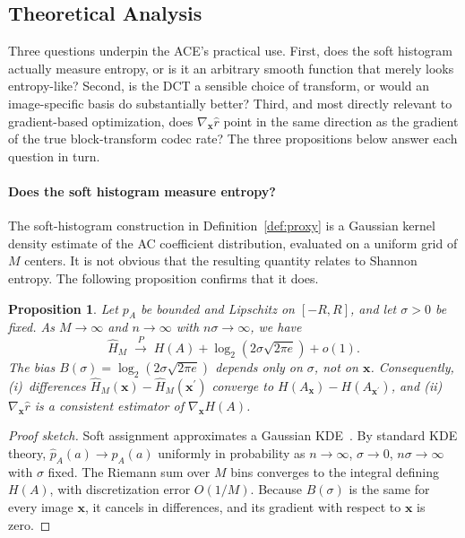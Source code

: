 \documentclass{article}
\newtheorem{proposition}{Proposition}
\theoremstyle{definition}
\newcommand{\bx}{\boldsymbol{x}}
\begin{document}
\subsection{Theoretical Analysis}
\label{sec:theory}

Three questions underpin the ACE's practical use.
First, does the soft histogram actually measure entropy, or is it an arbitrary smooth function that merely looks entropy-like?
Second, is the DCT a sensible choice of transform, or would an image-specific basis do substantially better?
Third, and most directly relevant to gradient-based optimization, does $\nabla_{\bx}\hat{r}$ point in the same direction as the gradient of the true block-transform codec rate?
The three propositions below answer each question in turn.

\paragraph{Does the soft histogram measure entropy?}
The soft-histogram construction in Definition~\ref{def:proxy} is a Gaussian kernel density estimate of the AC coefficient distribution, evaluated on a uniform grid of $M$ centers.
It is not obvious that the resulting quantity relates to Shannon entropy.
The following proposition confirms that it does.

\begin{proposition}
\label{prop:convergence}
Let $p_A$ be bounded and Lipschitz on $[-R,R]$, and let $\sigma>0$ be fixed.
As $M\to\infty$ and $n\to\infty$ with $n\sigma\to\infty$, we have
\[
  \hat{H}_M \;\xrightarrow{P}\; H(A) + \log_2(2\sigma\sqrt{2\pi e}) + o(1).
\]
The bias $B(\sigma)=\log_2(2\sigma\sqrt{2\pi e})$ depends only on $\sigma$, not on $\bx$.  Consequently, (i)~differences $\hat{H}_M(\bx)-\hat{H}_M(\bx^{\prime})$ converge to $H(A_{\bx})-H(A_{\bx^{\prime}})$, and (ii)~$\nabla_{\bx}\hat{r}$ is a consistent estimator of $\nabla_{\bx}H(A)$.
\end{proposition}

\begin{proof}[Proof sketch]
Soft assignment approximates a Gaussian KDE~\citep{parzen1962estimation}.
By standard KDE theory, $\hat{p}_A(a)\to p_A(a)$ uniformly in probability as $n\to\infty$, $\sigma\to0$, $n\sigma\to\infty$ with $\sigma$ fixed.
The Riemann sum over $M$ bins converges to the integral defining $H(A)$, with discretization error $O(1/M)$.
Because $B(\sigma)$ is the same for every image $\bx$, it cancels in differences, and its gradient with respect to $\bx$ is zero.
\end{proof}
\end{document}
